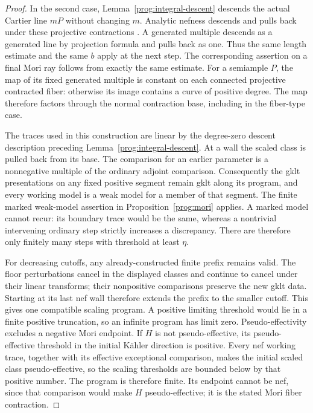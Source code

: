 \begin{proof}
In the second case, Lemma~\ref{prog:integral-descent} descends the actual Cartier line
\(mP\) without changing \(m\). Analytic nefness descends and pulls
back under these projective contractions \cite[Lemma~2.44]{HX}.
A generated multiple descends as a generated line by projection
formula and pulls back as one. Thus the same length estimate and the
same \(b\) apply at the next step. The corresponding assertion on
a final Mori ray follows from exactly the same estimate. For a
semiample \(P\), the map of its fixed generated multiple is constant
on each connected projective contracted fiber: otherwise its image
contains a curve of positive degree. The map therefore factors through
the normal contraction base, including in the fiber-type case.

The traces used in this construction are linear by the degree-zero
descent description preceding Lemma~\ref{prog:integral-descent}.
At a wall the scaled class is pulled back from its base. The comparison
for an earlier parameter is a nonnegative multiple of the ordinary
adjoint comparison. Consequently the gklt presentations on any fixed
positive segment remain gklt along its program, and every working
model is a weak model for a member of that segment. The finite marked
weak-model assertion in Proposition~\ref{prog:mori} applies.
A marked model cannot recur: its boundary trace would be the same,
whereas a nontrivial intervening ordinary step strictly increases a
discrepancy. There are therefore only finitely many steps with
threshold at least \(\eta\).

For decreasing cutoffs, any already-constructed finite prefix remains
valid. The floor perturbations cancel in the displayed classes and
continue to cancel under their linear transforms; their nonpositive
comparisons preserve the new gklt data. Starting at its last nef wall
therefore extends the prefix to the smaller cutoff. This gives one
compatible scaling program. A positive limiting threshold would lie
in a finite positive truncation, so an infinite program has limit zero.
Pseudo-effectivity excludes a negative Mori endpoint. If \(H\) is
not pseudo-effective, its pseudo-effective threshold in the initial
Kähler direction is positive. Every nef working trace, together with
its effective exceptional comparison, makes the initial scaled class
pseudo-effective, so the scaling thresholds are bounded below by
that positive number. The program is therefore finite. Its endpoint
cannot be nef, since that comparison would make \(H\)
pseudo-effective; it is the stated Mori fiber contraction.
\end{proof}


